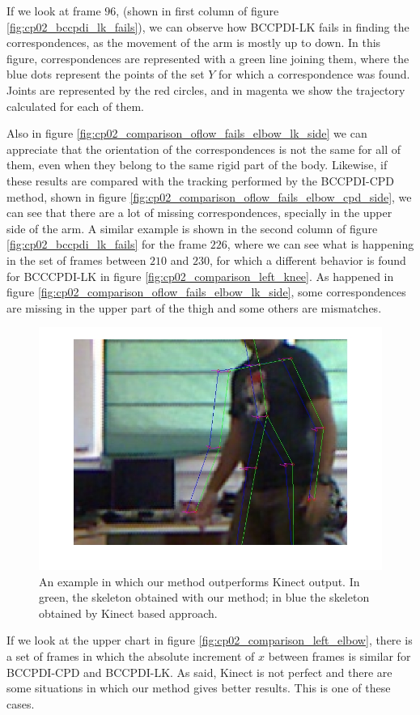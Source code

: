 If we look at frame $96$, (shown in first column of figure \ref{fig:cp02_bccpdi_lk_fails}), we can observe how BCCPDI-LK fails in finding the correspondences, as the movement of the arm is mostly up to down. In this figure, correspondences are represented with a green line joining 
them, where the blue dots represent the points of the set $Y$ for which a correspondence was found. Joints are represented by the red circles, and in magenta we show the trajectory calculated for each of them. 

Also in figure 
\ref{fig:cp02_comparison_oflow_fails_elbow_lk_side} we can appreciate that the 
orientation of the correspondences is not the same for all of them, even when they belong to the same rigid part of the 
body. Likewise, if these results are compared with the tracking performed by the BCCPDI-CPD method, shown in figure 
\ref{fig:cp02_comparison_oflow_fails_elbow_cpd_side}, we can see that there are a lot of missing correspondences, specially 
in the upper side of the arm. A similar example is shown in the second column of figure \ref{fig:cp02_bccpdi_lk_fails} for 
the frame $226$, where we can see what is happening in the set of frames between $210$ and $230$, for which a 
different behavior is found for BCCCPDI-LK in figure \ref{fig:cp02_comparison_left_knee}. As happened in figure 
\ref{fig:cp02_comparison_oflow_fails_elbow_lk_side}, some correspondences are missing in the upper part of the thigh and some 
others are mismatches.

\begin{figure}[h!]
  \centering
  \includegraphics[width=0.5\columnwidth, trim=0 0 0 0,clip]{fig34.jpg}
  \caption{An example in which our method outperforms Kinect output. In green, the skeleton obtained with our method; in blue the skeleton obtained by Kinect based approach.}
  \label{fig:cp02_comparison_kinect_fails}
\end{figure}

If we look at the upper chart in figure \ref{fig:cp02_comparison_left_elbow}, there is a set of frames in which the 
absolute increment of $x$ between frames is similar for BCCPDI-CPD and BCCPDI-LK. As said, Kinect is not perfect and 
there are some situations in which our method gives better results. This is one of these cases. 


